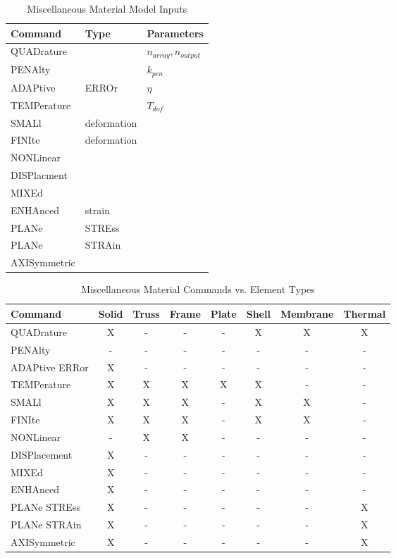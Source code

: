 \begin{table}[ht!]
\begin{center}
\begin{tabular}{| l | l | l |} \hline
Command & Type & Parameters \\ \hline
QUADrature  & {}       & $n_{array}, n_{output}$ \\
PENAlty     &          & $k_{pen}$ \\
ADAPtive    & ERROr    & $\eta$ \\
TEMPerature & {}       & $T_{dof}$ \\ \hline
SMALl       & deformation & {} \\
FINIte      & deformation & {} \\
NONLinear   & {}       & {} \\ \hline
DISPlacment & {}       & {} \\
MIXEd       & {}       & {} \\
ENHAnced    & strain   & {} \\ \hline
PLANe       & STREss   & {} \\
PLANe       & STRAin   & {} \\
AXISymmetric & {}      & {} \\ \hline
\end{tabular}
\end{center}
\caption{Miscellaneous Material Model Inputs}
\label{tab134a}
\end{table}

\begin{table}[ht!]
\begin{center}
\begin{tabular}{| l | c | c | c | c | c | c | c |} \hline
Command & Solid & Truss & Frame & Plate & Shell & Membrane & Thermal \\ \hline
QUADrature      & X & - & -  & - & X & X & X \\
PENAlty         & - & - & -  & - & - & - & - \\
ADAPtive ERRor  & X & - & -  & - & - & - & - \\
TEMPerature     & X & X & X  & X & X & - & - \\ \hline
SMALl           & X & X & X  & - & X & X & - \\
FINIte          & X & X & X  & - & X & X & - \\
NONLinear       & - & X & X  & - & - & - & - \\ \hline
DISPlacement    & X & - & -  & - & - & - & - \\
MIXEd           & X & - & -  & - & - & - & - \\
ENHAnced        & X & - & -  & - & - & - & - \\ \hline
PLANe STREss    & X & - & -  & - & - & - & X \\
PLANe STRAin    & X & - & -  & - & - & - & X \\
AXISymmetric    & X & - & -  & - & - & - & X \\ \hline
\end{tabular}
\end{center}
\caption{Miscellaneous Material Commands vs. Element Types}
\label{tab134b}
\end{table}

